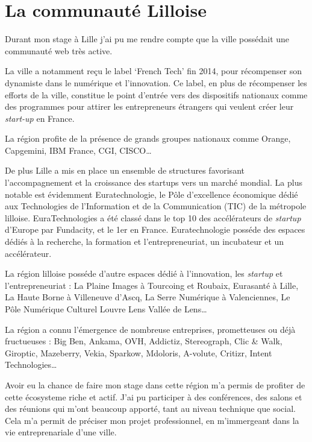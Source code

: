 \section{La communauté Lilloise}\label{la-communautuxe9-lilloise}

Durant mon stage à Lille j'ai pu me rendre compte que la ville possédait
une communauté web très active.

\bigskip

La ville a notamment reçu le label `French Tech' fin 2014, pour
récompenser son dynamiste dans le numérique et l'innovation. Ce label,
en plus de récompenser les efforts de la ville, constitue le point
d'entrée vers des dispositifs nationaux comme des programmes pour
attirer les entrepreneurs étrangers qui veulent créer leur
\emph{start-up} en France.

\bigskip

La région profite de la présence de grands groupes nationaux comme
Orange, Capgemini, IBM France, CGI, CISCO\ldots{}

\bigskip

De plus Lille a mis en place un ensemble de structures favorisant
l'accompagnement et la croissance des startups vers un marché mondial.
La plus notable est évidemment Euratechnologie, le Pôle d'excellence
économique dédié aux Technologies de l'Information et de la
Communication (TIC) de la métropole lilloise. EuraTechnologies a été
classé dans le top 10 des accélérateurs de \emph{startup} d'Europe par
Fundacity, et le 1er en France. Euratechnologie posséde des espaces
dédiés à la recherche, la formation et l'entrepreneuriat, un incubateur
et un accélérateur.

\bigskip

La région lilloise posséde d'autre espaces dédié à l'innovation, les
\emph{startup} et l'entrepreneuriat : La Plaine Images à Tourcoing et
Roubaix, Eurasanté à Lille, La Haute Borne à Villeneuve d'Ascq, La Serre
Numérique à Valenciennes, Le Pôle Numérique Culturel Louvre Lens Vallée
de Lens\ldots{}

\bigskip

La région a connu l'émergence de nombreuse entreprises, prometteuses ou
déjà fructueuses : Big Ben, Ankama, OVH, Addictiz, Stereograph, Clic \&
Walk, Giroptic, Mazeberry, Vekia, Sparkow, Mdoloris, A-volute, Critizr,
Intent Technologies\ldots{}

\bigskip

Avoir eu la chance de faire mon stage dans cette région m'a permis de
profiter de cette écosysteme riche et actif. J'ai pu participer à des
conférences, des salons et des réunions qui m'ont beaucoup apporté, tant
au niveau technique que social. Cela m'a permit de préciser mon projet
professionnel, en m'immergeant dans la vie entreprenariale d'une ville.

